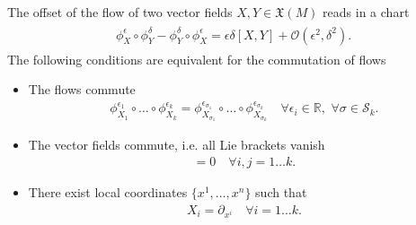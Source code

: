 \begin{mytheorem}
The offset of the flow of two vector fields $X,Y \in \mathfrak{X}(M)$ reads in a chart
\begin{align}
\begin{aligned}
    \phi_{X}^{\epsilon} \circ \phi_{Y}^{\delta} - \phi_{Y}^{\delta} \circ \phi_{X}^{\epsilon}= \epsilon \delta [X,Y] + \mathcal{O}(\epsilon^2, \delta^2).
\end{aligned}
\end{align}
The following conditions are equivalent for the commutation of flows
\begin{itemize}
    \item The flows commute
        \begin{align}
            \phi_{X_1}^{\epsilon_1}\circ\dots\circ \phi_{X_k}^{\epsilon_k} = \phi_{X_{\sigma_1}}^{\epsilon_{\sigma_1}}\circ\dots\circ \phi_{X_{\sigma_k}}^{\epsilon_{\sigma_k}} \quad \forall \epsilon_i \in \mathbb{R},\,\, \forall \sigma \in \mathcal{S}_k.
        \end{align}
    \item The vector fields commute, i.e. all Lie brackets vanish
        \begin{align}
            [X_i, X_j] = 0 \quad \forall i,j=1\dots k.
        \end{align} 
    \item There exist local coordinates $\{x^1, \dots, x^n\}$ such that
        \begin{align}
            X_i = \partial_{x^i} \quad \forall i=1\dots k.
        \end{align}
\end{itemize}
\end{mytheorem}
